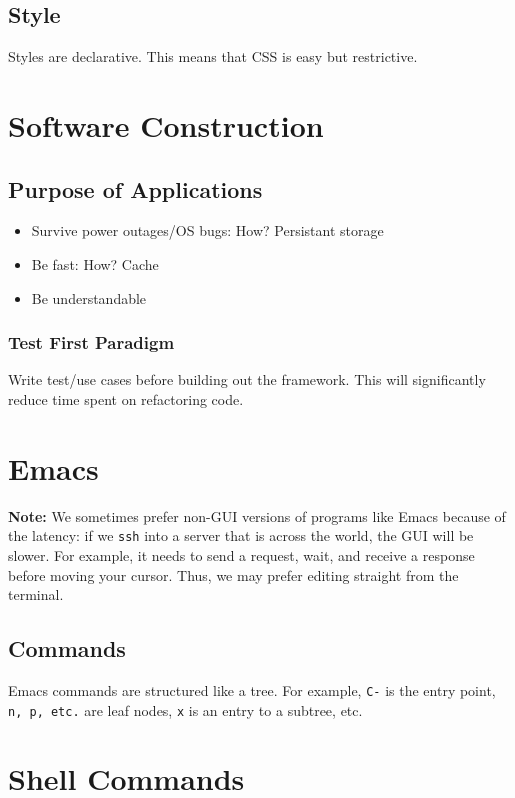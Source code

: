 \documentclass[13pt]{article}
\begin{document}
\subsection{Style}
Styles are declarative. This means that CSS is easy but restrictive.

\section{Software Construction}
\subsection{Purpose of Applications}
\begin{itemize}[leftmargin = 0pt]
\item [] Survive power outages/OS bugs: How? Persistant storage
\item [] Be fast: How? Cache
\item [] Be understandable
\end{itemize}
\subsubsection{Test First Paradigm}
Write test/use cases before building out the framework. This will significantly reduce time spent on refactoring code.

\section{Emacs}
\textbf{Note:} We sometimes prefer non-GUI versions of programs like Emacs because of the latency: if we \texttt{ssh} into a server that is across the world, the GUI will be slower. For example, it needs to send a request, wait, and receive a response before moving your cursor. Thus, we may prefer editing straight from the terminal.
\subsection{Commands}
Emacs commands are structured like a tree. For example, \texttt{C-} is the entry point, \texttt{n, p, etc.} are leaf nodes, \texttt{x} is an entry to a subtree, etc.

\section{Shell Commands}
\end{document}
